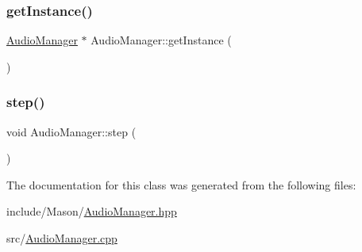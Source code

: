 \hypertarget{class_mason_1_1_audio_manager_a77de22887544ce37ae13d7c4d5cf7a79}{}\label{class_mason_1_1_audio_manager_a77de22887544ce37ae13d7c4d5cf7a79} 
\subsubsection{\texorpdfstring{get\+Instance()}{getInstance()}}
{\footnotesize\ttfamily \hyperlink{class_mason_1_1_audio_manager}{Audio\+Manager} $\ast$ Audio\+Manager\+::get\+Instance (\begin{DoxyParamCaption}{ }\end{DoxyParamCaption})\hspace{0.3cm}{\ttfamily [static]}}

\hypertarget{class_mason_1_1_audio_manager_a81eb2ff2bc2d1242e532c208b32d17ec}{}\label{class_mason_1_1_audio_manager_a81eb2ff2bc2d1242e532c208b32d17ec} 
\subsubsection{\texorpdfstring{step()}{step()}}
{\footnotesize\ttfamily void Audio\+Manager\+::step (\begin{DoxyParamCaption}{ }\end{DoxyParamCaption})}



The documentation for this class was generated from the following files\+:\begin{DoxyCompactItemize}
\item 
include/\+Mason/\hyperlink{_audio_manager_8hpp}{Audio\+Manager.\+hpp}\item 
src/\hyperlink{_audio_manager_8cpp}{Audio\+Manager.\+cpp}\end{DoxyCompactItemize}
